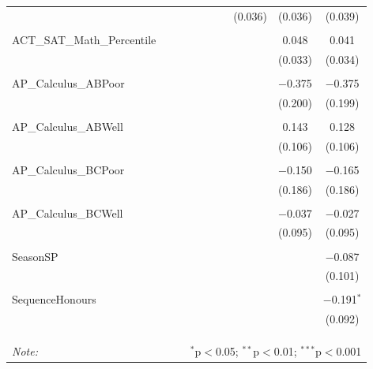 \begin{table}[!htbp]
\begin{tabular}{@{\extracolsep{5pt}}lccccccccc}
  &  &  &  &  &  &  & (0.036) & (0.036) & (0.039) \\ 
  & & & & & & & & & \\ 
 ACT\_SAT\_Math\_Percentile &  &  &  &  &  &  &  & 0.048 & 0.041 \\ 
  &  &  &  &  &  &  &  & (0.033) & (0.034) \\ 
  & & & & & & & & & \\ 
 AP\_Calculus\_ABPoor &  &  &  &  &  &  &  & $-$0.375 & $-$0.375 \\ 
  &  &  &  &  &  &  &  & (0.200) & (0.199) \\ 
  & & & & & & & & & \\ 
 AP\_Calculus\_ABWell &  &  &  &  &  &  &  & 0.143 & 0.128 \\ 
  &  &  &  &  &  &  &  & (0.106) & (0.106) \\ 
  & & & & & & & & & \\ 
 AP\_Calculus\_BCPoor &  &  &  &  &  &  &  & $-$0.150 & $-$0.165 \\ 
  &  &  &  &  &  &  &  & (0.186) & (0.186) \\ 
  & & & & & & & & & \\ 
 AP\_Calculus\_BCWell &  &  &  &  &  &  &  & $-$0.037 & $-$0.027 \\ 
  &  &  &  &  &  &  &  & (0.095) & (0.095) \\ 
  & & & & & & & & & \\ 
 SeasonSP &  &  &  &  &  &  &  &  & $-$0.087 \\ 
  &  &  &  &  &  &  &  &  & (0.101) \\ 
  & & & & & & & & & \\ 
 SequenceHonours &  &  &  &  &  &  &  &  & $-$0.191$^{*}$ \\ 
  &  &  &  &  &  &  &  &  & (0.092) \\ 
  & & & & & & & & & \\ 
\hline \\[-1.8ex] 
\hline 
\hline \\[-1.8ex] 
\textit{Note:}  & \multicolumn{9}{r}{$^{*}$p$<$0.05; $^{**}$p$<$0.01; $^{***}$p$<$0.001} \\ 
\end{tabular} 
\end{table} 
